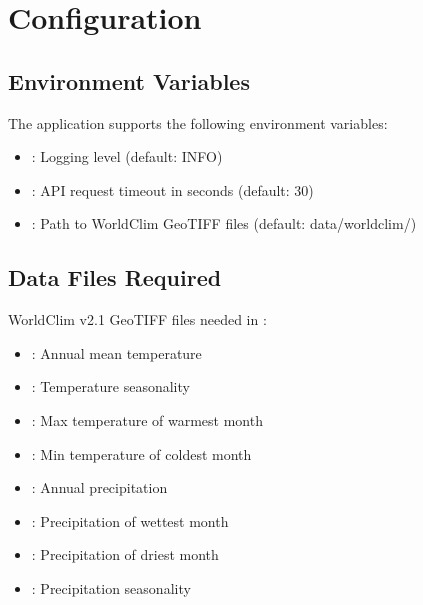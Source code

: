 \documentclass[letterpaper,10pt,english]{sphinxmanual}
\begin{document}
\section{Configuration}
\label{\detokenize{user_guide:configuration}}

\subsection{Environment Variables}
\label{\detokenize{user_guide:environment-variables}}
\sphinxAtStartPar
The application supports the following environment variables:
\begin{itemize}
\item {} 
\sphinxAtStartPar
{}: Logging level (default: INFO)

\item {} 
\sphinxAtStartPar
{}: API request timeout in seconds (default: 30)

\item {} 
\sphinxAtStartPar
{}: Path to WorldClim GeoTIFF files (default: data/worldclim/)

\end{itemize}


\subsection{Data Files Required}
\label{\detokenize{user_guide:data-files-required}}
\sphinxAtStartPar
WorldClim v2.1 GeoTIFF files needed in :
\begin{itemize}
\item {} 
\sphinxAtStartPar
{}: Annual mean temperature

\item {} 
\sphinxAtStartPar
{}: Temperature seasonality

\item {} 
\sphinxAtStartPar
{}: Max temperature of warmest month

\item {} 
\sphinxAtStartPar
{}: Min temperature of coldest month

\item {} 
\sphinxAtStartPar
{}: Annual precipitation

\item {} 
\sphinxAtStartPar
{}: Precipitation of wettest month

\item {} 
\sphinxAtStartPar
{}: Precipitation of driest month

\item {} 
\sphinxAtStartPar
{}: Precipitation seasonality

\end{itemize}
\end{document}
